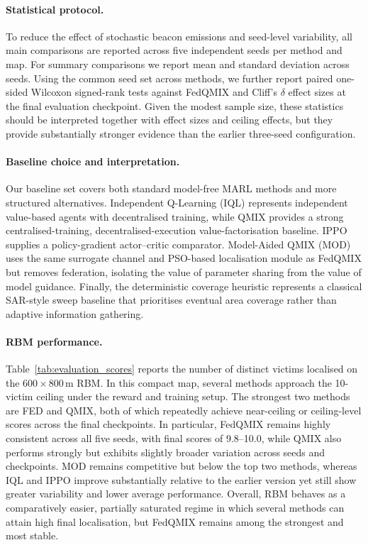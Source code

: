 \documentclass[drones,article,accept,pdftex,moreauthors]{Definitions/mdpi}
\begin{document}
\paragraph{Statistical protocol.}
To reduce the effect of stochastic beacon emissions and seed-level variability,
all main comparisons are reported across five independent seeds per method and map.
For summary comparisons we report mean and standard deviation across seeds.
Using the common seed set across methods, we further report paired one-sided
Wilcoxon signed-rank tests against FedQMIX and Cliff's $\delta$ effect sizes at the
final evaluation checkpoint. Given the modest sample size, these statistics should
be interpreted together with effect sizes and ceiling effects, but they provide
substantially stronger evidence than the earlier three-seed configuration.

\paragraph{Baseline choice and interpretation.}
Our baseline set covers both standard model-free MARL methods and more structured
alternatives. Independent Q-Learning (IQL) represents independent value-based agents
with decentralised training, while QMIX provides a strong centralised-training,
decentralised-execution value-factorisation baseline. IPPO supplies a policy-gradient
actor--critic comparator. Model-Aided QMIX (MOD) uses the same surrogate channel and
PSO-based localisation module as FedQMIX but removes federation, isolating the value
of parameter sharing from the value of model guidance. Finally, the deterministic
coverage heuristic represents a classical SAR-style sweep baseline that prioritises
eventual area coverage rather than adaptive information gathering.


\paragraph{RBM performance.}
Table~\ref{tab:evaluation_scores} reports the number of distinct victims localised on
the $600{\times}800$\,m RBM. In this compact map, several methods approach the
10-victim ceiling under the reward and training setup. The strongest two
methods are \textsc{FED} and \textsc{QMIX}, both of which repeatedly achieve
near-ceiling or ceiling-level scores across the final checkpoints. In particular,
FedQMIX remains highly consistent across all five seeds, with final scores of
9.8--10.0, while QMIX also performs strongly but exhibits slightly broader variation
across seeds and checkpoints. MOD remains competitive but below the top two methods,
whereas IQL and IPPO improve substantially relative to the earlier version yet still
show greater variability and lower average performance. Overall, RBM behaves as a
comparatively easier, partially saturated regime in which several methods can attain
high final localisation, but FedQMIX remains among the strongest and most stable.
\end{document}
